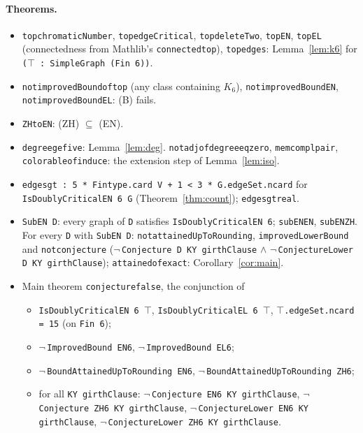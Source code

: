 \documentclass[11pt]{article}
\theoremstyle{definition}
\theoremstyle{remark}
\renewcommand{\_}{\oldus\allowbreak}
\begin{document}
\paragraph{Theorems.}
\begin{itemize}
  \item \texttt{top\_chromaticNumber}, \texttt{top\_edgeCritical}, \texttt{top\_deleteTwo},
        \texttt{top\_EN}, \texttt{top\_EL} (connectedness from Mathlib's \texttt{connected\_top}),
        \texttt{top\_edges}: Lemma~\ref{lem:k6} for \texttt{($\top$ : SimpleGraph (Fin 6))}.
  \item \texttt{not\_improvedBound\_of\_top} (any class containing $K_6$), \texttt{not\_improvedBound\_EN},
        \texttt{not\_improvedBound\_EL}: (B) fails.
  \item \texttt{ZH\_to\_EN}: (ZH) $\subseteq$ (EN).
  \item \texttt{degree\_ge\_five}: Lemma~\ref{lem:deg}. \texttt{not\_adj\_of\_degree\_eq\_zero},
        \texttt{mem\_compl\_pair}, \texttt{colorable\_of\_induce}: the extension step of Lemma~\ref{lem:iso}.
  \item \texttt{edges\_gt : 5 * Fintype.card V + 1 < 3 * G.edgeSet.ncard} for \texttt{IsDoublyCriticalEN 6 G}
        (Theorem~\ref{thm:count}); \texttt{edges\_gt\_real}.
  \item \texttt{SubEN D}: every graph of \texttt{D} satisfies \texttt{IsDoublyCriticalEN 6};
        \texttt{subEN\_EN}, \texttt{subEN\_ZH}. For every \texttt{D} with \texttt{SubEN D}:
        \texttt{not\_attainedUpToRounding}, \texttt{improvedLowerBound} and \texttt{not\_conjecture}
        ($\neg$\,\texttt{Conjecture D KY girthClause} $\wedge$ $\neg$\,\texttt{ConjectureLower D KY girthClause});
        \texttt{attained\_of\_exact}: Corollary~\ref{cor:main}.
  \item Main theorem \texttt{conjecture\_00000003462\_false}, the conjunction of
  \begin{itemize}
    \item \texttt{IsDoublyCriticalEN 6 $\top$}, \texttt{IsDoublyCriticalEL 6 $\top$},
          \texttt{$\top$.edgeSet.ncard = 15} (on \texttt{Fin 6});
    \item $\neg$\,\texttt{ImprovedBound EN6}, $\neg$\,\texttt{ImprovedBound EL6};
    \item $\neg$\,\texttt{BoundAttainedUpToRounding EN6}, $\neg$\,\texttt{BoundAttainedUpToRounding ZH6};
    \item for all \texttt{KY girthClause}: $\neg$\,\texttt{Conjecture EN6 KY girthClause},
          $\neg$\,\texttt{Conjecture ZH6 KY girthClause}, $\neg$\,\texttt{ConjectureLower EN6 KY girthClause},
          $\neg$\,\texttt{ConjectureLower ZH6 KY girthClause}.
  \end{itemize}
\end{itemize}
\end{document}
